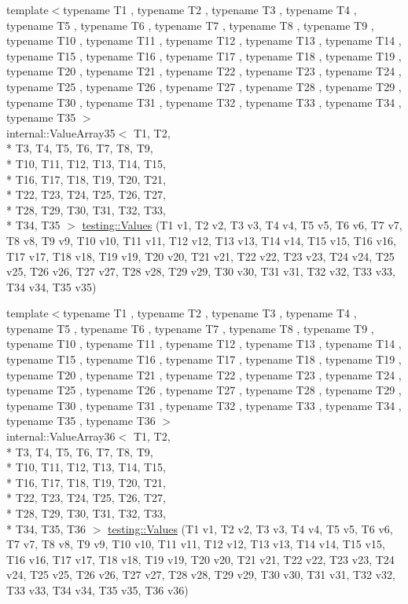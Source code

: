 \begin{DoxyCompactItemize}
\item 
{\footnotesize template$<$typename T1 , typename T2 , typename T3 , typename T4 , typename T5 , typename T6 , typename T7 , typename T8 , typename T9 , typename T10 , typename T11 , typename T12 , typename T13 , typename T14 , typename T15 , typename T16 , typename T17 , typename T18 , typename T19 , typename T20 , typename T21 , typename T22 , typename T23 , typename T24 , typename T25 , typename T26 , typename T27 , typename T28 , typename T29 , typename T30 , typename T31 , typename T32 , typename T33 , typename T34 , typename T35 $>$ }\\internal\-::\-Value\-Array35$<$ T1, T2, \\*
T3, T4, T5, T6, T7, T8, T9, \\*
T10, T11, T12, T13, T14, T15, \\*
T16, T17, T18, T19, T20, T21, \\*
T22, T23, T24, T25, T26, T27, \\*
T28, T29, T30, T31, T32, T33, \\*
T34, T35 $>$ \hyperlink{namespacetesting_a8746425c9d27e46ea5bc5fd77586bc2a}{testing\-::\-Values} (T1 v1, T2 v2, T3 v3, T4 v4, T5 v5, T6 v6, T7 v7, T8 v8, T9 v9, T10 v10, T11 v11, T12 v12, T13 v13, T14 v14, T15 v15, T16 v16, T17 v17, T18 v18, T19 v19, T20 v20, T21 v21, T22 v22, T23 v23, T24 v24, T25 v25, T26 v26, T27 v27, T28 v28, T29 v29, T30 v30, T31 v31, T32 v32, T33 v33, T34 v34, T35 v35)
\item 
{\footnotesize template$<$typename T1 , typename T2 , typename T3 , typename T4 , typename T5 , typename T6 , typename T7 , typename T8 , typename T9 , typename T10 , typename T11 , typename T12 , typename T13 , typename T14 , typename T15 , typename T16 , typename T17 , typename T18 , typename T19 , typename T20 , typename T21 , typename T22 , typename T23 , typename T24 , typename T25 , typename T26 , typename T27 , typename T28 , typename T29 , typename T30 , typename T31 , typename T32 , typename T33 , typename T34 , typename T35 , typename T36 $>$ }\\internal\-::\-Value\-Array36$<$ T1, T2, \\*
T3, T4, T5, T6, T7, T8, T9, \\*
T10, T11, T12, T13, T14, T15, \\*
T16, T17, T18, T19, T20, T21, \\*
T22, T23, T24, T25, T26, T27, \\*
T28, T29, T30, T31, T32, T33, \\*
T34, T35, T36 $>$ \hyperlink{namespacetesting_ae5d25537f4919c9e82d02c45af4c7c5f}{testing\-::\-Values} (T1 v1, T2 v2, T3 v3, T4 v4, T5 v5, T6 v6, T7 v7, T8 v8, T9 v9, T10 v10, T11 v11, T12 v12, T13 v13, T14 v14, T15 v15, T16 v16, T17 v17, T18 v18, T19 v19, T20 v20, T21 v21, T22 v22, T23 v23, T24 v24, T25 v25, T26 v26, T27 v27, T28 v28, T29 v29, T30 v30, T31 v31, T32 v32, T33 v33, T34 v34, T35 v35, T36 v36)

\end{DoxyCompactItemize}
